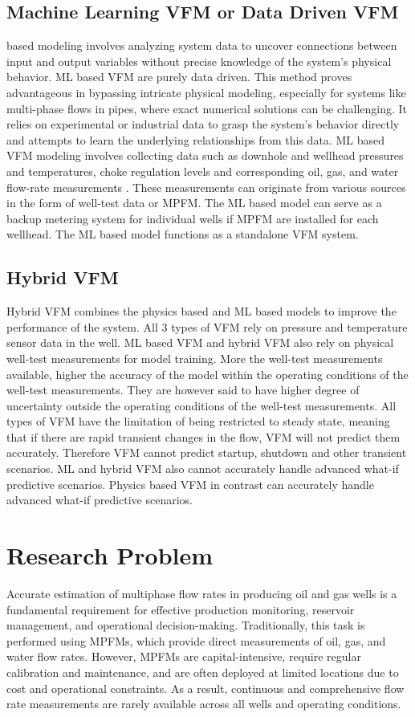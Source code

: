 \documentclass[12pt,APA]{uomthesis}
\begin{document}
\subsection{Machine Learning VFM or Data Driven VFM}
 based modeling involves analyzing system data to uncover connections between input and output variables without precise knowledge of the system's physical behavior. ML based VFM are purely data driven. This method proves advantageous in bypassing intricate physical modeling, especially for systems like multi-phase flows in pipes, where exact numerical solutions can be challenging. It relies on experimental or industrial data to grasp the system's behavior directly and attempts to learn the underlying relationships from this data. ML based VFM modeling involves collecting data such as downhole and wellhead pressures and temperatures, choke regulation levels and corresponding oil, gas, and water flow-rate measurements \citep{agwu2022modelling}. These measurements can originate from various sources in the form of well-test data or MPFM. The ML based model can serve as a backup metering system for individual wells if MPFM are installed for each wellhead. The ML based model functions as a standalone VFM system.

\subsection{Hybrid VFM}
Hybrid VFM combines the physics based and ML based models to improve the performance of the system. All 3 types of VFM rely on pressure and temperature sensor data in the well. ML based VFM and hybrid VFM also rely on physical well-test measurements for model training. More the well-test measurements available, higher the accuracy of the model within the operating conditions of the well-test measurements. They are however said to have higher degree of uncertainty outside the operating conditions of the well-test measurements. All types of VFM have the limitation of being restricted to steady state, meaning that if there are rapid transient changes in the flow, VFM will not predict them accurately. Therefore VFM cannot predict startup, shutdown and other transient scenarios. ML and hybrid VFM also cannot accurately handle advanced what-if predictive scenarios. Physics based VFM in contrast can accurately handle advanced what-if predictive scenarios.

\section{Research Problem}
\label{sec:problem}
Accurate estimation of multiphase flow rates in producing oil and gas wells is a fundamental requirement for effective production monitoring, reservoir management, and operational decision-making. Traditionally, this task is performed using MPFMs, which provide direct measurements of oil, gas, and water flow rates. However, MPFMs are capital-intensive, require regular calibration and maintenance, and are often deployed at limited locations due to cost and operational constraints. As a result, continuous and comprehensive flow rate measurements are rarely available across all wells and operating conditions.
\end{document}
